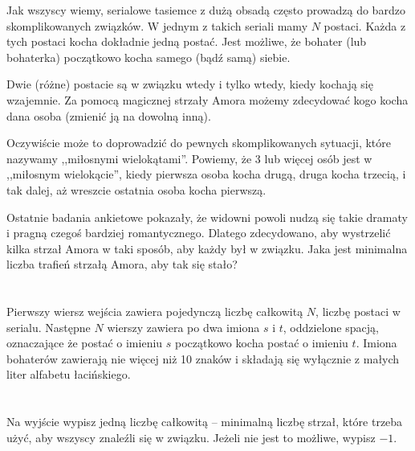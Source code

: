 \ifx\boi\undefined\fi
\def\version{jury-1}

Jak wszyscy wiemy, serialowe tasiemce z dużą obsadą często prowadzą do bardzo skomplikowanych związków.
W jednym z takich seriali mamy $N$ postaci. Każda z tych postaci kocha dokładnie jedną postać.
Jest możliwe, że bohater (lub bohaterka) początkowo kocha samego (bądź samą) siebie.

Dwie (różne) postacie są w związku wtedy i tylko wtedy, kiedy kochają się wzajemnie.
Za pomocą magicznej strzały Amora możemy zdecydować kogo kocha dana osoba (zmienić ją na dowolną inną).

Oczywiście może to doprowadzić do pewnych skomplikowanych sytuacji, które nazywamy ,,miłosnymi wielokątami''.
Powiemy, że 3 lub więcej osób jest w ,,miłosnym wielokącie'', kiedy pierwsza osoba kocha drugą, druga kocha trzecią,
i tak dalej, aż wreszcie ostatnia osoba kocha pierwszą.

Ostatnie badania ankietowe pokazały, że widowni powoli nudzą się takie dramaty i pragną
czegoś bardziej romantycznego. Dlatego zdecydowano, aby wystrzelić kilka strzał Amora w taki sposób,
aby każdy był w związku. Jaka jest minimalna liczba trafień strzałą Amora, aby tak się stało?

\section*{}
Pierwszy wiersz wejścia zawiera pojedynczą liczbę całkowitą $N$, liczbę postaci w serialu.
Następne $N$ wierszy zawiera po dwa imiona $s$ i $t$, oddzielone spacją, oznaczające
że postać o imieniu $s$ początkowo kocha postać o imieniu $t$. Imiona bohaterów zawierają
nie więcej niż 10 znaków i składają się wyłącznie z małych liter alfabetu łacińskiego. %

\section*{\outputsection}
Na wyjście wypisz jedną liczbę całkowitą -- minimalną liczbę strzał, które trzeba użyć, aby wszyscy
znaleźli się w związku. Jeżeli nie jest to możliwe, wypisz $-1$.

\section*{\constraints}
\testgroups

